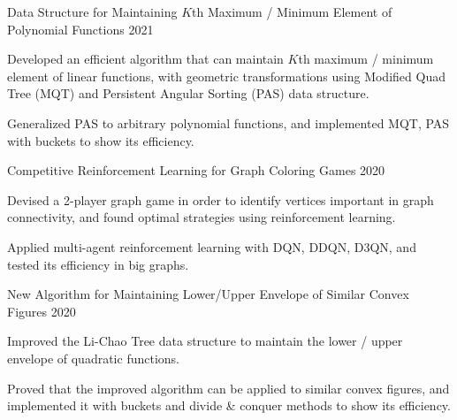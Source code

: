 



\begin{cventries}


  \cventry
    {Data Structure for Maintaining $K$th Maximum / Minimum Element of Polynomial Functions} %
    {2021} %
    {
      \begin{cvitems} %
        \item {Developed an efficient algorithm that can maintain $K$th maximum / minimum element of linear functions, with geometric transformations using Modified Quad Tree (MQT) and Persistent Angular Sorting (PAS) data structure.}
        \item {Generalized PAS to arbitrary polynomial functions, and implemented MQT, PAS with buckets to show its efficiency.}
      \end{cvitems}
    }
    

  \cventry
    {Competitive Reinforcement Learning for Graph Coloring Games} %
    {2020} %
    {
      \begin{cvitems} %
        \item {Devised a 2-player graph game in order to identify vertices important in graph connectivity, and found optimal strategies using reinforcement learning.}
        \item {Applied multi-agent reinforcement learning with DQN, DDQN, D3QN, and tested its efficiency in big graphs.}
      \end{cvitems}
    }


  \cventry
    {New Algorithm for Maintaining Lower/Upper Envelope of Similar Convex Figures} %
    {2020} %
    {
      \begin{cvitems} %
        \item {Improved the Li-Chao Tree data structure to maintain the lower / upper envelope of quadratic functions.}
        \item {Proved that the improved algorithm can be applied to similar convex figures, and implemented it with buckets and divide \& conquer methods to show its efficiency.}
      \end{cvitems}
    }


\end{cventries}
